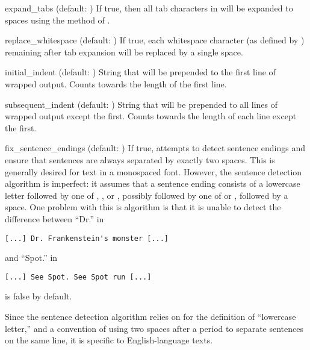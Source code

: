 \begin{memberdesc}{expand_tabs}
(default: ) If true, then all tab characters in 
will be expanded to spaces using the  method of
.
\end{memberdesc}

\begin{memberdesc}{replace_whitespace}
(default: ) If true, each whitespace character (as defined
by ) remaining after tab expansion will be
replaced by a single space.  
\end{memberdesc}

\begin{memberdesc}{initial_indent}
(default: ) String that will be prepended to the first line
of wrapped output.  Counts towards the length of the first line.
\end{memberdesc}

\begin{memberdesc}{subsequent_indent}
(default: ) String that will be prepended to all lines of
wrapped output except the first.  Counts towards the length of each
line except the first.
\end{memberdesc}

\begin{memberdesc}{fix_sentence_endings}
(default: ) If true,  attempts to detect
sentence endings and ensure that sentences are always separated by
exactly two spaces.  This is generally desired for text in a monospaced
font.  However, the sentence detection algorithm is imperfect: it
assumes that a sentence ending consists of a lowercase letter followed
by one of ,
\character{!}, or , possibly followed by one of
 or , followed by a space.  One problem
with this is algorithm is that it is unable to detect the difference
between ``Dr.'' in

\begin{verbatim}
[...] Dr. Frankenstein's monster [...]
\end{verbatim}

and ``Spot.'' in

\begin{verbatim}
[...] See Spot. See Spot run [...]
\end{verbatim}

 is false by default.

Since the sentence detection algorithm relies on
 for the definition of ``lowercase letter,''
and a convention of using two spaces after a period to separate
sentences on the same line, it is specific to English-language texts.
\end{memberdesc}

